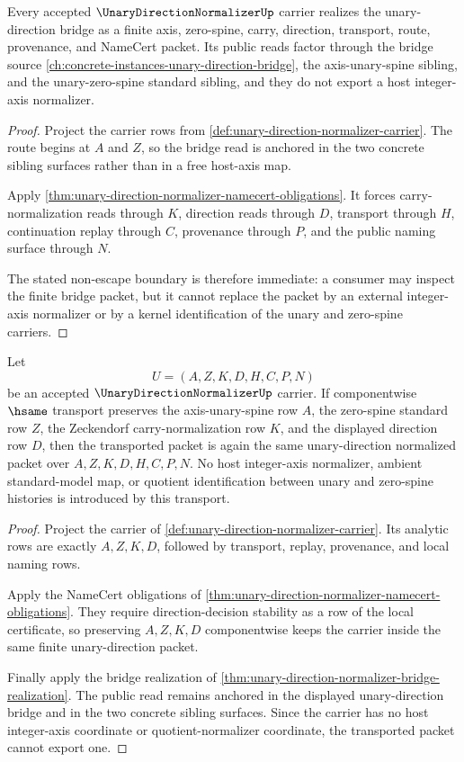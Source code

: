\begin{theorem}
\label{thm:unary-direction-normalizer-bridge-realization}
Every accepted $\UnaryDirectionNormalizerUp$ carrier realizes the unary-direction bridge as a finite axis, zero-spine, carry, direction, transport, route, provenance, and NameCert packet. Its public reads factor through the bridge source \autoref{ch:concrete-instances-unary-direction-bridge}, the axis-unary-spine sibling, and the unary-zero-spine standard sibling, and they do not export a host integer-axis normalizer.
\end{theorem}
\begin{proof}
Project the carrier rows from \autoref{def:unary-direction-normalizer-carrier}. The route begins at $A$ and $Z$, so the bridge read is anchored in the two concrete sibling surfaces rather than in a free host-axis map.

Apply \autoref{thm:unary-direction-normalizer-namecert-obligations}. It forces carry-normalization reads through $K$, direction reads through $D$, transport through $H$, continuation replay through $C$, provenance through $P$, and the public naming surface through $N$.

The stated non-escape boundary is therefore immediate: a consumer may inspect the finite bridge packet, but it cannot replace the packet by an external integer-axis normalizer or by a kernel identification of the unary and zero-spine carriers.
\end{proof}

\begin{theorem}
\label{thm:unary-direction-normalizer-direction-row-stability}
Let
$$
U=(A,Z,K,D,H,C,P,N)
$$
be an accepted $\UnaryDirectionNormalizerUp$ carrier. If componentwise $\hsame$ transport preserves the axis-unary-spine row $A$, the zero-spine standard row $Z$, the Zeckendorf carry-normalization row $K$, and the displayed direction row $D$, then the transported packet is again the same unary-direction normalized packet over $A,Z,K,D,H,C,P,N$. No host integer-axis normalizer, ambient standard-model map, or quotient identification between unary and zero-spine histories is introduced by this transport.
\end{theorem}
\begin{proof}
Project the carrier of \autoref{def:unary-direction-normalizer-carrier}. Its analytic rows are exactly $A,Z,K,D$, followed by transport, replay, provenance, and local naming rows.

Apply the NameCert obligations of \autoref{thm:unary-direction-normalizer-namecert-obligations}. They require direction-decision stability as a row of the local certificate, so preserving $A,Z,K,D$ componentwise keeps the carrier inside the same finite unary-direction packet.

Finally apply the bridge realization of \autoref{thm:unary-direction-normalizer-bridge-realization}. The public read remains anchored in the displayed unary-direction bridge and in the two concrete sibling surfaces. Since the carrier has no host integer-axis coordinate or quotient-normalizer coordinate, the transported packet cannot export one.
\end{proof}


